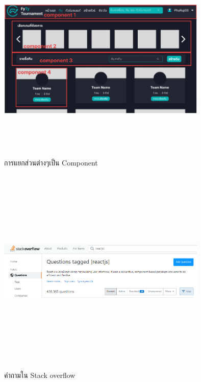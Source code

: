 \begin{figure}[h]
    \begin{center}
    \includegraphics[width=10cm,height=10cm,keepaspectratio]{component.png}
    \end{center}
    \caption[การแยกส่วนต่างๆเป็น Component]{การแยกส่วนต่างๆเป็น Component}
    \label{fig:การแยกส่วนต่างๆเป็น Component}
\end{figure}

\begin{figure}[h]
    \begin{center}
    \includegraphics[width=10cm,height=10cm,keepaspectratio]{stack overflow.png}
    \end{center}
    \caption[คำถามใน Stack overflow]{คำถามใน Stack overflow}
    \label{fig:คำถามใน Stack overflow (ค้นหาเมื่อ 14/10/2565)}
\end{figure}

